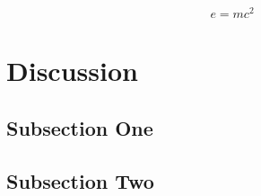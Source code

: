 \documentclass[twoside,twocolumn]{article}
\begin{document}
\blindtext %

\begin{equation}
\label{eq:emc}
e = mc^2
\end{equation}






\section{Discussion}

\subsection{Subsection One}


\subsection{Subsection Two}


\end{document}
